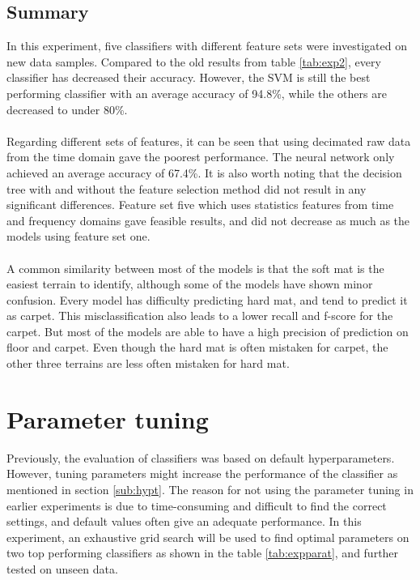 \documentclass[USenglish]{ifimaster}  %
\begin{document}
\FloatBarrier
\newpage

\subsection{Summary}
In this experiment, five classifiers with different feature sets were investigated on new data samples. Compared to the old results from table \ref{tab:exp2}, every classifier has decreased their accuracy. However, the SVM is still the best performing classifier with an average accuracy of 94.8\%, while the others are decreased to under 80\%. 
\\
\\
Regarding different sets of features, it can be seen that using decimated raw data from the time domain gave the poorest performance. The neural network only achieved an average accuracy of 67.4\%. It is also worth noting that the decision tree with and without the feature selection method did not result in any significant differences. Feature set five which uses statistics features from time and frequency domains gave feasible results, and did not decrease as much as the models using feature set one.
\\
\\
A common similarity between most of the models is that the soft mat is the easiest terrain to identify, although some of the models have shown minor confusion. Every model has difficulty predicting hard mat, and tend to predict it as carpet. This misclassification also leads to a lower recall and f-score for the carpet. But most of the models are able to have a high precision of prediction on floor and carpet. Even though the hard mat is often mistaken for carpet, the other three terrains are less often mistaken for hard mat.


\newpage
\section{Parameter tuning}
Previously, the evaluation of classifiers was based on default hyperparameters. However, tuning parameters might increase the performance of the classifier as mentioned in section \ref{sub:hypt}. The reason for not using the parameter tuning in earlier experiments is due to time-consuming and difficult to find the correct settings, and default values often give an adequate performance. In this experiment, an exhaustive grid search will be used to find optimal parameters on two top performing classifiers as shown in the table \ref{tab:expparat}, and further tested on unseen data.
\end{document}
